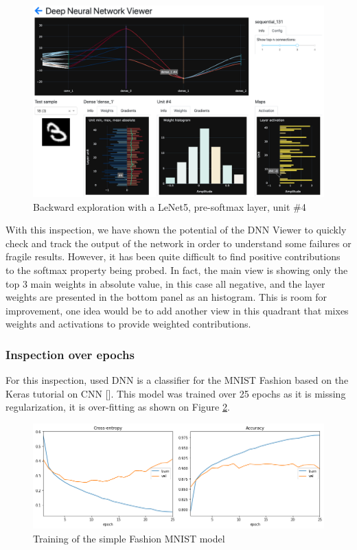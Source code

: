 \begin{figure}[H]
    \centering
    \includegraphics[scale=0.3]{images/dnn-viewer/BackwardThree_7.png}
    \caption{Backward exploration with a LeNet5, pre-softmax layer, unit \#4}
    \label{fig:dnn-viewer-backward-7}
\end{figure}

With this inspection, we have shown the potential of the DNN Viewer to quickly check and track the output of the network in order to understand some failures or fragile results. However, it has been quite difficult to find positive contributions to the softmax property being probed. In fact, the main view is showing only the top 3 main weights in absolute value, in this case all negative, and the layer weights are presented in the bottom panel as an histogram. This is room for improvement, one idea would be to add another view in this quadrant that mixes weights and activations to provide weighted contributions.

\subsubsection{Inspection over epochs}

For this inspection, used DNN is a classifier for the MNIST Fashion based on the Keras tutorial on CNN [\cite{keras-tutorial-cnn}]. This model was trained over 25 epochs as it is missing regularization, it is over-fitting as shown on Figure \ref{fig:dnn-viewer-time-training}.

\begin{figure}[H]
    \centering
    \includegraphics[scale=0.3]{images/dnn-viewer/Fashion-MNIST_Training.png}
    \caption{Training of the simple Fashion MNIST model}
    \label{fig:dnn-viewer-time-training}
\end{figure}

